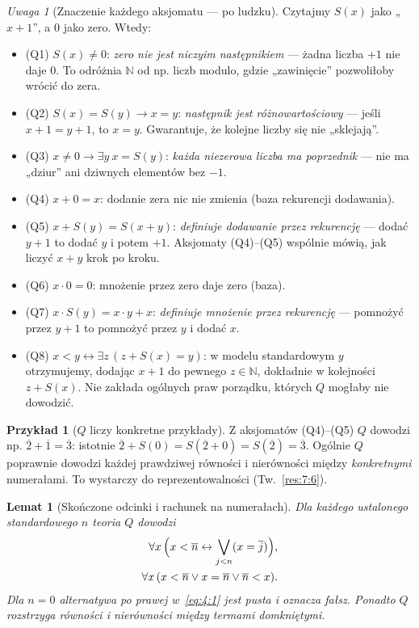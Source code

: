\documentclass[11pt,a4paper]{article}
\numberwithin{equation}{section}
\theoremstyle{plain}
\newtheorem{lemat}[twierdzenie]{Lemat}
\theoremstyle{definition}
\newtheorem{przyklad}[twierdzenie]{Przykład}
\theoremstyle{remark}
\newtheorem{uwaga}[twierdzenie]{Uwaga}
\begin{document}
\begin{uwaga}[Znaczenie każdego aksjomatu --- po ludzku]\label{res:4:2}
Czytajmy $S(x)$ jako „$x+1$”, a $0$ jako zero. Wtedy:
\begin{itemize}
\item \textup{(Q1)} $S(x)\ne0$: \emph{zero nie jest niczyim następnikiem} --- żadna liczba $+1$ nie daje $0$. To odróżnia $\mathbb N$ od np. liczb modulo, gdzie „zawinięcie” pozwoliłoby wrócić do zera.
\item \textup{(Q2)} $S(x)=S(y)\to x=y$: \emph{następnik jest różnowartościowy} --- jeśli $x+1=y+1$, to $x=y$. Gwarantuje, że kolejne liczby się nie „sklejają”.
\item \textup{(Q3)} $x\ne0\to\exists y\ x=S(y)$: \emph{każda niezerowa liczba ma poprzednik} --- nie ma „dziur” ani dziwnych elementów bez $-1$.
\item \textup{(Q4)} $x+0=x$: dodanie zera nic nie zmienia (baza rekurencji dodawania).
\item \textup{(Q5)} $x+S(y)=S(x+y)$: \emph{definiuje dodawanie przez rekurencję} --- dodać $y+1$ to dodać $y$ i potem $+1$. Aksjomaty (Q4)--(Q5) wspólnie mówią, jak liczyć $x+y$ krok po kroku.
\item \textup{(Q6)} $x\cdot0=0$: mnożenie przez zero daje zero (baza).
\item \textup{(Q7)} $x\cdot S(y)=x\cdot y+x$: \emph{definiuje mnożenie przez rekurencję} --- pomnożyć przez $y+1$ to pomnożyć przez $y$ i dodać $x$.
\item \textup{(Q8)} $x<y\leftrightarrow\exists z\,(z+S(x)=y)$: w modelu standardowym $y$ otrzymujemy, dodając $x+1$ do pewnego $z\in\mathbb N$, dokładnie w kolejności $z+S(x)$. Nie zakłada ogólnych praw porządku, których $Q$ mogłaby nie dowodzić.
\end{itemize}
\end{uwaga}

\begin{przyklad}[$Q$ liczy konkretne przykłady]\label{res:4:3}
Z aksjomatów (Q4)--(Q5) $Q$ dowodzi np. $\overline2+\overline1=\overline3$: istotnie $\overline2+S(0)=S(\overline2+0)=S(\overline2)=\overline3$. Ogólnie $Q$ poprawnie dowodzi każdej prawdziwej równości i nierówności między \emph{konkretnymi} numerałami. To wystarczy do reprezentowalności (Tw.~\ref{res:7:6}).
\end{przyklad}

\begin{lemat}[Skończone odcinki i rachunek na numerałach]\label{res:4:4}
Dla każdego ustalonego standardowego $n$ teoria $Q$ dowodzi
\begin{align}
\forall x\,\Bigl(x<\overline n\leftrightarrow\bigvee_{j<n}(x=\overline j)\Bigr),\label{eq:4:1}\\
\forall x\,(x<\overline n\lor x=\overline n\lor\overline n<x).\label{eq:4:2}
\end{align}
Dla $n=0$ alternatywa po prawej w~\eqref{eq:4:1} jest pusta i oznacza fałsz. Ponadto $Q$ rozstrzyga równości i nierówności między termami domkniętymi.
\end{lemat}
\end{document}
